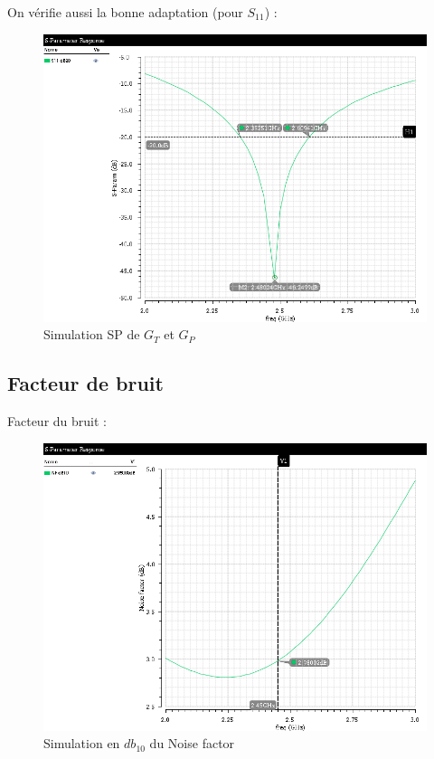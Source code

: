 \documentclass[a4paper]{article}
\begin{document}
On v\'erifie aussi la bonne adaptation (pour $S_{11}$) :


\begin{figure}[!htb]
\begin{center}
  \includegraphics[scale=0.45]{Q5-S11-db20.png}
  \caption{Simulation SP de $G_T$ et $G_P$  }
  \label{sim-q5}
\end{center}
\end{figure}

\clearpage
\subsection{Facteur de bruit}

Facteur du bruit :

\begin{figure}[!htb]
\begin{center}
  \includegraphics[scale=0.45]{Q6-NF-dB10.png}
  \caption{Simulation en $db_{10}$ du Noise factor}
  \label{facteur-bruit}
\end{center}
\end{figure}
\end{document}
